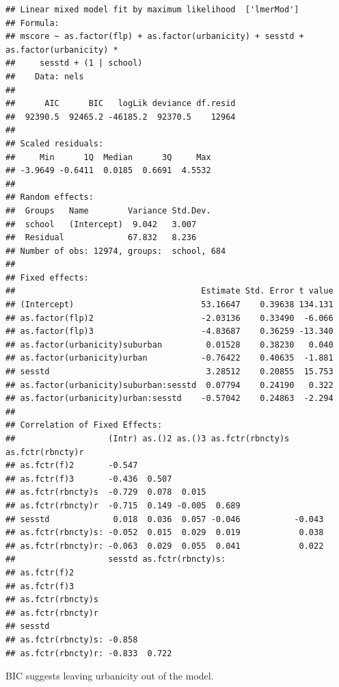 \documentclass[ignorenonframetext,]{beamer}
\begin{document}
\begin{frame}[fragile]{}
\begin{verbatim}
## Linear mixed model fit by maximum likelihood  ['lmerMod']
## Formula: 
## mscore ~ as.factor(flp) + as.factor(urbanicity) + sesstd + as.factor(urbanicity) *  
##     sesstd + (1 | school)
##    Data: nels
## 
##      AIC      BIC   logLik deviance df.resid 
##  92390.5  92465.2 -46185.2  92370.5    12964 
## 
## Scaled residuals: 
##     Min      1Q  Median      3Q     Max 
## -3.9649 -0.6411  0.0185  0.6691  4.5532 
## 
## Random effects:
##  Groups   Name        Variance Std.Dev.
##  school   (Intercept)  9.042   3.007   
##  Residual             67.832   8.236   
## Number of obs: 12974, groups:  school, 684
## 
## Fixed effects:
##                                      Estimate Std. Error t value
## (Intercept)                          53.16647    0.39638 134.131
## as.factor(flp)2                      -2.03136    0.33490  -6.066
## as.factor(flp)3                      -4.83687    0.36259 -13.340
## as.factor(urbanicity)suburban         0.01528    0.38230   0.040
## as.factor(urbanicity)urban           -0.76422    0.40635  -1.881
## sesstd                                3.28512    0.20855  15.753
## as.factor(urbanicity)suburban:sesstd  0.07794    0.24190   0.322
## as.factor(urbanicity)urban:sesstd    -0.57042    0.24863  -2.294
## 
## Correlation of Fixed Effects:
##                   (Intr) as.()2 as.()3 as.fctr(rbncty)s as.fctr(rbncty)r
## as.fctr(f)2       -0.547                                                
## as.fctr(f)3       -0.436  0.507                                         
## as.fctr(rbncty)s  -0.729  0.078  0.015                                  
## as.fctr(rbncty)r  -0.715  0.149 -0.005  0.689                           
## sesstd             0.018  0.036  0.057 -0.046           -0.043          
## as.fctr(rbncty)s: -0.052  0.015  0.029  0.019            0.038          
## as.fctr(rbncty)r: -0.063  0.029  0.055  0.041            0.022          
##                   sesstd as.fctr(rbncty)s:
## as.fctr(f)2                               
## as.fctr(f)3                               
## as.fctr(rbncty)s                          
## as.fctr(rbncty)r                          
## sesstd                                    
## as.fctr(rbncty)s: -0.858                  
## as.fctr(rbncty)r: -0.833  0.722
\end{verbatim}

BIC suggests leaving urbanicity out of the model.

\end{frame}
\end{document}
